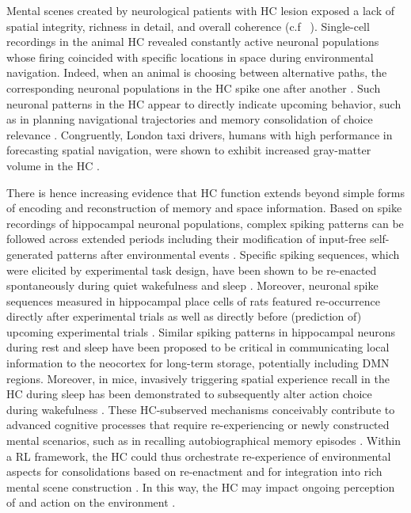 \documentclass[10pt,letterpaper]{article}
\begin{document}
Mental scenes created by neurological patients with HC lesion exposed a lack of
spatial integrity, richness in detail, and overall coherence (c.f ~\citep{hassabis2007patients}).
%
Single-cell recordings in the animal HC revealed
constantly active neuronal populations whose firing coincided with
specific locations in space during environmental navigation.
Indeed, when an animal is choosing between alternative
paths, the corresponding neuronal populations in the HC
spike one after another  \citep{johnson2007neural}.
Such neuronal patterns in the HC appear to directly indicate upcoming behavior,
such as in planning navigational trajectories
\citep{pfeiffer2013hippocampal} and
memory consolidation of choice relevance \citep{lavilleon2015}.
Congruently,
London taxi drivers, humans with high performance in forecasting spatial navigation,
were shown to exhibit increased gray-matter volume in the
HC \citep{maguire2000navigation}.


There is hence increasing evidence that
HC function extends beyond simple forms of
encoding and reconstruction of memory and space information.
Based on spike recordings of hippocampal neuronal populations,
complex spiking patterns can be followed across extended periods including
their modification of input-free self-generated patterns
after environmental events \citep{buzsaki2004large}.
Specific spiking sequences, which were elicited by experimental task design,
have been shown to be re-enacted spontaneously during
quiet wakefulness and sleep \citep{hartley2014space, o2010play}.
Moreover, neuronal spike sequences measured in hippocampal place cells of rats
featured re-occurrence directly after experimental trials
as well as directly before (prediction of) upcoming experimental trials \citep{diba2007forward}.
Similar spiking patterns in hippocampal neurons during rest and sleep
have been proposed to be critical in communicating local information
to the neocortex for long-term storage, potentially including DMN regions.
Moreover, in mice, invasively triggering spatial experience recall
in the HC during sleep
has been demonstrated to subsequently alter action choice during wakefulness
\citep{lavilleon2015}.
These HC-subserved mechanisms
conceivably contribute to advanced cognitive processes that require
re-experiencing or newly constructed mental scenarios,
such as in recalling autobiographical memory episodes
\citep{hassabis2007patients}.
Within a RL framework, the HC could thus orchestrate re-experience of environmental aspects for
consolidations based on re-enactment and for integration into
rich mental scene construction \citep{deuker2016event, bird2010establishing}.
In this way, the HC may impact
ongoing perception of and action on the environment
\citep{maguire2016, lavilleon2015}.
\end{document}
